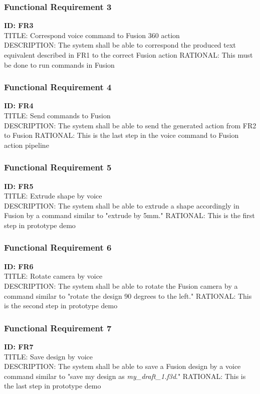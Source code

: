\documentclass[onecolumn, draftclsnofoot,10pt, compsoc]{IEEEtran}
\begin{document}
        \subsubsection{Functional Requirement 3}
    	\textbf{ID: FR3} \\
        TITLE: Correspond voice command to Fusion 360 action  \\
        DESCRIPTION: The system shall be able to correspond the produced text equivalent described in FR1 to the correct Fusion action
        RATIONAL: This must be done to run commands in Fusion 
        
        \subsubsection{Functional Requirement 4}
    	\textbf{ID: FR4} \\
        TITLE: Send commands to Fusion  \\
        DESCRIPTION: The system shall be able to send the generated action from FR2 to Fusion
        RATIONAL: This is the last step in the voice command to Fusion action pipeline 
        
        \subsubsection{Functional Requirement 5}
    	\textbf{ID: FR5} \\
        TITLE: Extrude shape by voice \\
        DESCRIPTION: The system shall be able to extrude a shape accordingly in Fusion by a command similar to "extrude by 5mm."
        RATIONAL: This is the first step in prototype demo 
        
        \subsubsection{Functional Requirement 6}
    	\textbf{ID: FR6} \\
        TITLE: Rotate camera by voice \\
        DESCRIPTION: The system shall be able to rotate the Fusion camera by a command similar to "rotate the design 90 degrees to the left." 
        RATIONAL: This is the second step in prototype demo 
        
        \subsubsection{Functional Requirement 7}
    	\textbf{ID: FR7} \\
        TITLE: Save design by voice \\
        DESCRIPTION: The system shall be able to save a Fusion design by a voice command similar to "save my design as \textit{my\_draft\_1.f3d}."
        RATIONAL: This is the last step in prototype demo 
        
\end{document}
